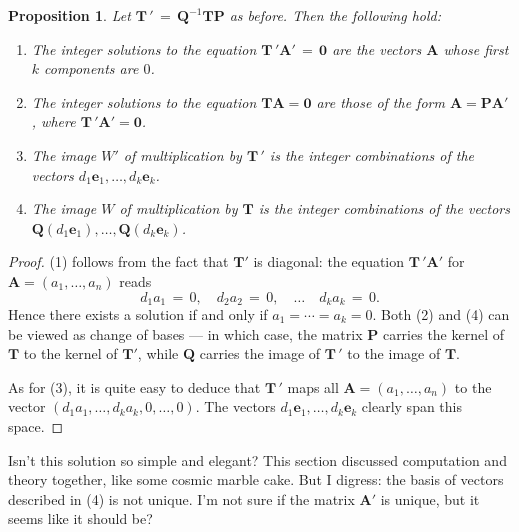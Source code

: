 \documentclass[11pt]{article}
\newtheorem{proposition}{Proposition}
\renewcommand{\vec}[1]{\mathbf{#1}}
\newcommand{\mat}[1]{\mathbf{#1}}
\begin{document}
\begin{adjustwidth}{0.5cm}{}
  \begin{proposition}
    Let $\mat{T} \, ' \, = \, \mat{Q}^{-1}\mat{T}\mat{P}$ as before. Then the following hold:
    \begin{enumerate}
      \item The integer solutions to the equation $\mat{T} \, ' \vec{A}' \, = \, \vec{0}$ are the vectors $\mat{A}$ whose first $k$ components are $0$.
      \item The integer solutions to the equation $\mat{T} \vec{A} = \vec{0}$ are those of the form $\mat{A} = \mat{P} \vec{A}'$, where $\mat{T} \, ' \vec{A}' = \vec{0}$.
      \item The image $W'$ of multiplication by $\mat{T} \,'$ is the integer combinations of the vectors $d_{1} \vec{e}_{1}, \ldots, d_{k} \vec{e}_{k}$.
      \item The image $W$ of multiplication by $\mat{T}$ is the integer combinations of the vectors $\mat{Q} (d_{1} \vec{e}_{1}), \ldots, \mat{Q} (d_{k} \vec{e}_{k})$.
    \end{enumerate}
  \end{proposition}
  \begin{proof}
    (1) follows from the fact that $\mat{T}'$ is diagonal: the equation $\mat{T} \, ' \vec{A}'$ for $\vec{A} = (a_{1}, \ldots, a_{n})$ reads
    \[
      d_{1}a_{1} \, = \, 0, \quad d_{2}a_{2} \, = \, 0, \quad \ldots \quad d_{k}a_{k} \, = \, 0.
    \]
    Hence there exists a solution if and only if $a_{1} = \cdots = a_{k} = 0$. Both (2) and (4) can be viewed as change of bases --- in which case, the matrix $\mat{P}$ carries the kernel of $\mat{T}$ to the kernel of $\mat{T}'$, while $\mat{Q}$ carries the image of $\mat{T} \, '$ to the image of $\mat{T}$.

    As for (3), it is quite easy to deduce that $\mat{T} \, '$ maps all $\vec{A} = (a_{1}, \ldots, a_{n})$ to the vector $(d_{1}a_{1}, \ldots, d_{k}a_{k}, 0, \ldots, 0)$. The vectors $d_{1} \vec{e}_{1}, \ldots, d_{k} \vec{e}_{k}$ clearly span this space.
  \end{proof}
\end{adjustwidth}

Isn't this solution so simple and elegant? This section discussed computation and theory together, like some cosmic marble cake. But I digress: the basis of vectors described in (4) is not unique. I'm not sure if the matrix $\mat{A}'$ is unique, but it seems like it should be?

\end{document}
